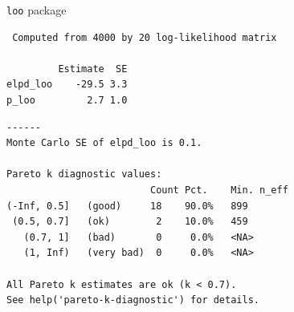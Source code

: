 \documentclass[english,t]{beamer}
\begin{document}
\begin{frame}[fragile]

  {\Large\color{navyblue} {\tt loo} package}

  {\scriptsize
\begin{lstlisting}
 Computed from 4000 by 20 log-likelihood matrix

         Estimate  SE
elpd_loo    -29.5 3.3
p_loo         2.7 1.0
\end{lstlisting}
      {\color{gray}
\begin{lstlisting}
------
Monte Carlo SE of elpd_loo is 0.1.

Pareto k diagnostic values:
                         Count Pct.    Min. n_eff
(-Inf, 0.5]   (good)     18    90.0%   899       
 (0.5, 0.7]   (ok)        2    10.0%   459       
   (0.7, 1]   (bad)       0     0.0%   <NA>      
   (1, Inf)   (very bad)  0     0.0%   <NA>      

All Pareto k estimates are ok (k < 0.7).
See help('pareto-k-diagnostic') for details.
\end{lstlisting}}
}
\end{frame}
\end{document}
